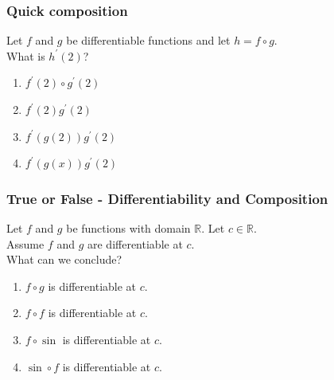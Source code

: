 \begin{frame}
	\frametitle{Quick composition}

	Let $f$ and $g$ be differentiable functions and let $h=f\circ g$. \\ What is $h
	^{\prime}(2)$? \begin {enumerate} \item $f^{\prime}(2)\circ g^{\prime}(2)$
	\item $f^{\prime}(2)g^{\prime}(2)$ \item $f^{\prime}(g(2)) g^{\prime}(2)$
	\item $f^{\prime}(g(x)) g^{\prime}(2)$ \end{enumerate}

\end{frame}

\begin{frame}[t]
	\frametitle{True or False - Differentiability and Composition}

	Let $f$ and $g$ be functions with domain $\mathbb{R}$. Let $c \in \mathbb{R}$.
	\\ Assume $f$ and $g$ are differentiable at $c$. \\ What can we conclude?

	\vfill

	\begin{enumerate}
		\item $f \circ g$ \; is {\color{blue} differentiable} at $c$.
			\vfill

		\item $f \circ f$ \; is {\color{blue} differentiable} at $c$.
			\vfill

		\item $f \circ \sin$ \; is {\color{blue} differentiable} at $c$.
			\vfill

		\item $\sin \circ f$ \; is {\color{blue} differentiable} at $c$.
			\vfill
	\end{enumerate}
\end{frame}

